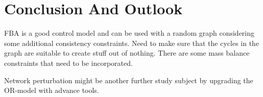 \chapter{Conclusion And Outlook}
{\color{red}

FBA is a good control model and can be used with a random graph considering some additional consistency constraints. Need to make sure that the cycles in the graph are suitable to create stuff out of nothing. There are some mass balance constraints that need to be incorporated.

Network perturbation might be another further study subject by upgrading the OR-model with advance tools.
 
}